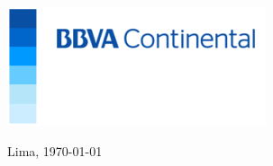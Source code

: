 %
%


\begin{flushleft}
\includegraphics[natwidth=7.593541667cm, natheight=3.4925cm]{resources/logo_bbva_continental.png}  
\end{flushleft}

\begin{flushleft}
    Lima, \today
\end{flushleft}

